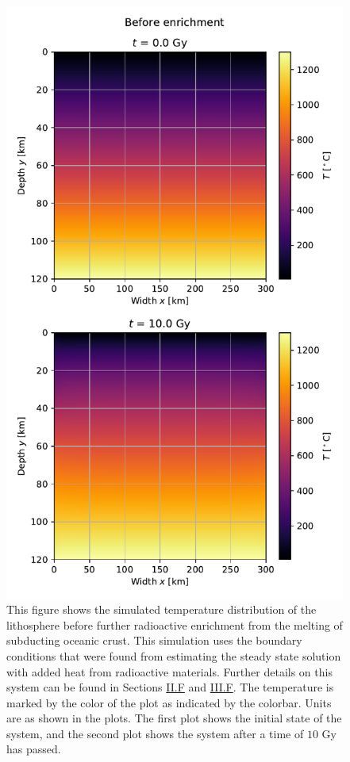 \documentclass[reprint,english,notitlepage]{revtex4-1}  %
\begin{document}
\begin{figure}[H]
\centering
\includegraphics[width=\columnwidth]{../data/2D_heat_before.pdf}
\caption{This figure shows the simulated temperature distribution of the lithosphere before further radioactive enrichment from the melting of subducting oceanic crust. This simulation uses the boundary conditions that were found from estimating the steady state solution with added heat from radioactive materials. Further details on this system can be found in Sections \hyperref[sec:formalism_temp_dist_lithosphere]{II.F} and \hyperref[sec:method_heat_sim]{III.F}. The temperature is marked by the color of the plot as indicated by the colorbar. Units are as shown in the plots. The first plot shows the initial state of the system, and the second plot shows the system after a time of $10$ Gy has passed.} \label{fig:lithosphere_before_enrichment}
\end{figure}
\end{document}
